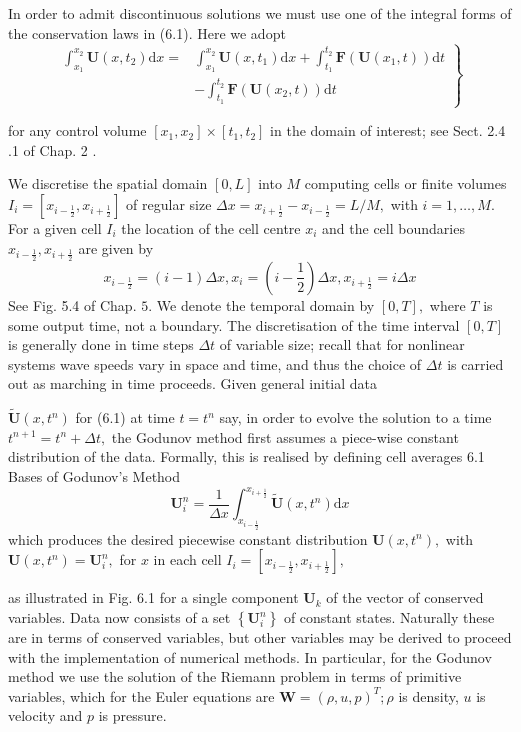 In order to admit discontinuous solutions we must use one of the integral forms of the conservation laws in (6.1). Here we adopt
$$
\left.\begin{array}{rl}
\int_{x_{1}}^{x_{2}} \mathbf{U}\left(x, t_{2}\right) \mathrm{d} x= & \int_{x_{1}}^{x_{2}} \mathbf{U}\left(x, t_{1}\right) \mathrm{d} x+\int_{t_{1}}^{t_{2}} \mathbf{F}\left(\mathbf{U}\left(x_{1}, t\right)\right) \mathrm{d} t \\
& -\int_{t_{1}}^{t_{2}} \mathbf{F}\left(\mathbf{U}\left(x_{2}, t\right)\right) \mathrm{d} t
\end{array}\right\}
$$

for any control volume $\left[x_{1}, x_{2}\right] \times\left[t_{1}, t_{2}\right]$ in the domain of interest; see Sect. 2.4 .1 of Chap. 2 .

We discretise the spatial domain $[0, L]$ into $M$ computing cells or finite volumes $I_{i}=\left[x_{i-\frac{1}{2}}, x_{i+\frac{1}{2}}\right]$ of regular size $\Delta x=x_{i+\frac{1}{2}}-x_{i-\frac{1}{2}}=L / M,$ with
$i=1, \ldots, M .$ For a given cell $I_{i}$ the location of the cell centre $x_{i}$ and the cell boundaries $x_{i-\frac{1}{2}}, x_{i+\frac{1}{2}}$ are given by
$$
x_{i-\frac{1}{2}}=(i-1) \Delta x, x_{i}=\left(i-\frac{1}{2}\right) \Delta x, x_{i+\frac{1}{2}}=i \Delta x
$$
See Fig. 5.4 of Chap. $5 .$ We denote the temporal domain by $[0, T],$ where $T$ is some output time, not a boundary. The discretisation of the time interval $[0, T]$ is generally done in time steps $\Delta t$ of variable size; recall that for nonlinear systems wave speeds vary in space and time, and thus the choice of $\Delta t$ is carried out as marching in time proceeds. Given general initial data

$\widetilde{\mathbf{U}}\left(x, t^{n}\right)$ for (6.1) at time $t=t^{n}$ say, in order to evolve the solution to a time $t^{n+1}=t^{n}+\Delta t,$ the Godunov method first assumes a piece-wise constant distribution of the data. Formally, this is realised by defining cell averages
6.1 Bases of Godunov's Method
$$
\mathbf{U}_{i}^{n}=\frac{1}{\Delta x} \int_{x_{i-\frac{1}{2}}}^{x_{i+\frac{1}{2}}} \widetilde{\mathbf{U}}\left(x, t^{n}\right) \mathrm{d} x
$$
which produces the desired piecewise constant distribution $\mathbf{U}\left(x, t^{n}\right),$ with
$\mathbf{U}\left(x, t^{n}\right)=\mathbf{U}_{i}^{n},$ for $x$ in each cell $I_{i}=\left[x_{i-\frac{1}{2}}, x_{i+\frac{1}{2}}\right],$

as illustrated in Fig. 6.1 for a single component $\mathbf{U}_{k}$ of the vector of conserved variables. Data now consists of a set $\left\{\mathbf{U}_{i}^{n}\right\}$ of constant states. Naturally these are in terms of conserved variables, but other variables may be derived to proceed with the implementation of numerical methods. In particular, for the Godunov method we use the solution of the Riemann problem in terms of primitive variables, which for the Euler equations are $\mathbf{W}=(\rho, u, p)^{T} ; \rho$ is density, $u$ is velocity and $p$ is pressure.

